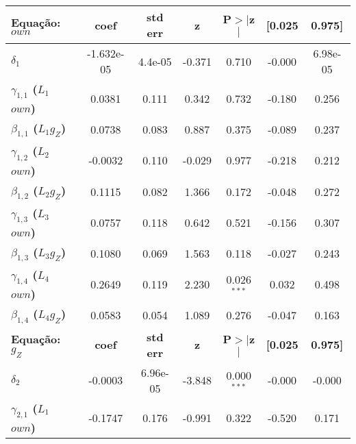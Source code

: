 \label{Estimacao}
\begin{threeparttable}
	\begin{tabular}{lcccccc}
		\hline \hline
		\textbf{Equação:} $own$ & \textbf{coef} & \textbf{std err} & \textbf{z} & \textbf{P$> |$z$|$} & \textbf{[0.025} & \textbf{0.975]}  \\
		\midrule
		\textbf{$\delta_{1}$}      &   -1.632e-05  &      4.4e-05     &    -0.371  &         0.710        &       -0.000    &     6.98e-05     \\
		\textbf{$\gamma_{1,1}$ ($L_1$ $own$)} &       0.0381  &        0.111     &     0.342  &         0.732        &       -0.180    &        0.256     \\
		\textbf{$\beta_{1,1}$ ($L_1 g_Z$)}           &       0.0738  &        0.083     &     0.887  &         0.375        &       -0.089    &        0.237     \\
		\textbf{$\gamma_{1,2}$ ($L_2$ $own$)} &      -0.0032  &        0.110     &    -0.029  &         0.977        &       -0.218    &        0.212     \\
		\textbf{$\beta_{1,2}$ ($L_2 g_Z$)}           &       0.1115  &        0.082     &     1.366  &         0.172        &       -0.048    &        0.272     \\
		\textbf{$\gamma_{1,3}$ ($L_3$ $own$)} &       0.0757  &        0.118     &     0.642  &         0.521        &       -0.156    &        0.307     \\
		\textbf{$\beta_{1,3}$ ($L_3 g_Z$)}           &       0.1080  &        0.069     &     1.563  &         0.118        &       -0.027    &        0.243     \\
		\textbf{$\gamma_{1,4}$ ($L_4$ $own$)} &       0.2649  &        0.119     &     2.230  &         0.026$^{***}$        &        0.032    &        0.498     \\
		\textbf{$\beta_{1,4}$ ($L_4 g_Z$)}           &      0.0583  &        0.054     &    1.089  &         0.276        &       -0.047    &       0.163     \\
		\midrule
		\textbf{Equação:} $g_Z$ & \textbf{coef} & \textbf{std err} & \textbf{z} & \textbf{P$> |$z$|$} & \textbf{[0.025} & \textbf{0.975]}  \\
		\midrule
		\textbf{$\delta_{2}$}      &      -0.0003  &     6.96e-05     &    -3.848  &         0.000$^{***}$        &       -0.000    &       -0.000     \\
		\textbf{$\gamma_{2,1}$ ($L_1$ $own$)} &      -0.1747  &        0.176     &    -0.991  &         0.322        &       -0.520    &        0.171     \\

\end{tabular}
\end{threeparttable}
